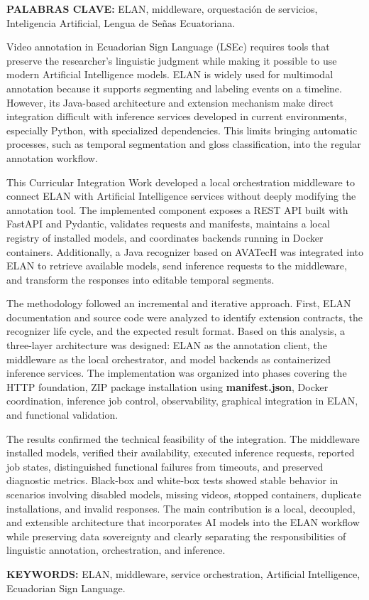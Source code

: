 \textbf{PALABRAS CLAVE:} ELAN, middleware, orquestación de servicios, Inteligencia Artificial, Lengua de Señas Ecuatoriana.

Video annotation in Ecuadorian Sign Language (LSEc) requires tools that preserve the researcher's linguistic judgment while making it possible to use modern Artificial Intelligence models. ELAN is widely used for multimodal annotation because it supports segmenting and labeling events on a timeline. However, its Java-based architecture and extension mechanism make direct integration difficult with inference services developed in current environments, especially Python, with specialized dependencies. This limits bringing automatic processes, such as temporal segmentation and gloss classification, into the regular annotation workflow.

This Curricular Integration Work developed a local orchestration middleware to connect ELAN with Artificial Intelligence services without deeply modifying the annotation tool. The implemented component exposes a REST API built with FastAPI and Pydantic, validates requests and manifests, maintains a local registry of installed models, and coordinates backends running in Docker containers. Additionally, a Java recognizer based on AVATecH was integrated into ELAN to retrieve available models, send inference requests to the middleware, and transform the responses into editable temporal segments.

The methodology followed an incremental and iterative approach. First, ELAN documentation and source code were analyzed to identify extension contracts, the recognizer life cycle, and the expected result format. Based on this analysis, a three-layer architecture was designed: ELAN as the annotation client, the middleware as the local orchestrator, and model backends as containerized inference services. The implementation was organized into phases covering the HTTP foundation, ZIP package installation using \textbf{manifest.json}, Docker coordination, inference job control, observability, graphical integration in ELAN, and functional validation.

The results confirmed the technical feasibility of the integration. The middleware installed models, verified their availability, executed inference requests, reported job states, distinguished functional failures from timeouts, and preserved diagnostic metrics. Black-box and white-box tests showed stable behavior in scenarios involving disabled models, missing videos, stopped containers, duplicate installations, and invalid responses. The main contribution is a local, decoupled, and extensible architecture that incorporates AI models into the ELAN workflow while preserving data sovereignty and clearly separating the responsibilities of linguistic annotation, orchestration, and inference.

\textbf{KEYWORDS:} ELAN, middleware, service orchestration, Artificial Intelligence, Ecuadorian Sign Language.
\setcounter{frontmatterlastpage}{\value{page}}